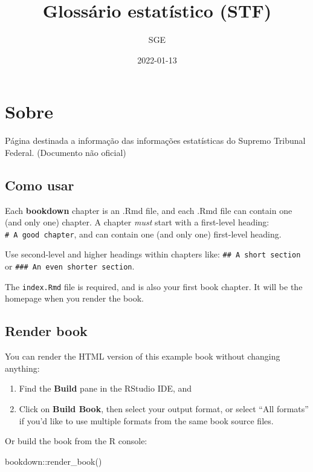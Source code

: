\documentclass[
]{book}
\title{Glossário estatístico (STF)}
\author{SGE}
\date{2022-01-13}
\newenvironment{Shaded}{\begin{snugshade}}{\end{snugshade}}
\newcommand{\FunctionTok}[1]{\textcolor[rgb]{0.00,0.00,0.00}{#1}}
\newcommand{\NormalTok}[1]{#1}
\newcommand{\SpecialCharTok}[1]{\textcolor[rgb]{0.00,0.00,0.00}{#1}}
\begin{document}
\maketitle

{
\setcounter{tocdepth}{1}
\tableofcontents
}
\hypertarget{sobre}{%
\chapter{Sobre}\label{sobre}}

Página destinada a informação das informações estatísticas do Supremo Tribunal Federal. (Documento não oficial)

\hypertarget{como-usar}{%
\section{Como usar}\label{como-usar}}

Each \textbf{bookdown} chapter is an .Rmd file, and each .Rmd file can contain one (and only one) chapter. A chapter \emph{must} start with a first-level heading: \texttt{\#\ A\ good\ chapter}, and can contain one (and only one) first-level heading.

Use second-level and higher headings within chapters like: \texttt{\#\#\ A\ short\ section} or \texttt{\#\#\#\ An\ even\ shorter\ section}.

The \texttt{index.Rmd} file is required, and is also your first book chapter. It will be the homepage when you render the book.

\hypertarget{render-book}{%
\section{Render book}\label{render-book}}

You can render the HTML version of this example book without changing anything:

\begin{enumerate}
\def\labelenumi{\arabic{enumi}.}
\item
  Find the \textbf{Build} pane in the RStudio IDE, and
\item
  Click on \textbf{Build Book}, then select your output format, or select ``All formats'' if you'd like to use multiple formats from the same book source files.
\end{enumerate}

Or build the book from the R console:

\begin{Shaded}
\begin{Highlighting}[]
\NormalTok{bookdown}\SpecialCharTok{::}\FunctionTok{render\_book}\NormalTok{()}
\end{Highlighting}
\end{Shaded}
\end{document}
